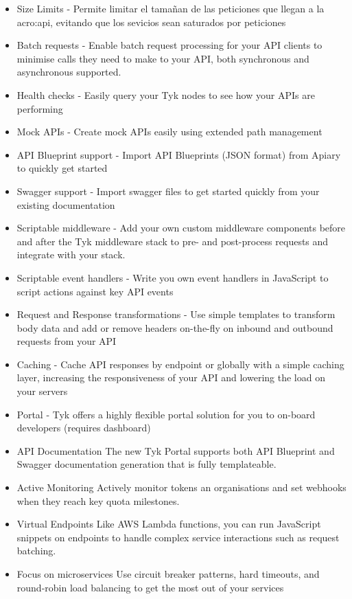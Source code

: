 \begin{itemize}
  \item Size Limits - Permite limitar el tamañan de las peticiones que llegan a la \gls{acro:api}, evitando que los sevicios sean saturados por peticiones
  \item Batch requests - Enable batch request processing for your API clients to minimise calls they need to make to your API, both synchronous and asynchronous supported.
  \item Health checks - Easily query your Tyk nodes to see how your APIs are performing
  \item Mock APIs - Create mock APIs easily using extended path management
  \item API Blueprint support - Import API Blueprints (JSON format) from Apiary to quickly get started
  \item Swagger support - Import swagger files to get started quickly from your existing documentation
  \item Scriptable middleware - Add your own custom middleware components before and after the Tyk middleware stack to pre- and post-process requests and integrate with your stack.
  \item Scriptable event handlers - Write you own event handlers in JavaScript to script actions against key API events
  \item Request and Response transformations - Use simple templates to transform body data and add or remove headers on-the-fly on inbound and outbound requests from your API
  \item Caching - Cache API responses by endpoint or globally with a simple caching layer, increasing the responsiveness of your API and lowering the load on your servers
  \item Portal - Tyk offers a highly flexible portal solution for you to on-board developers (requires dashboard)
  \item API Documentation The new Tyk Portal supports both API Blueprint and Swagger documentation generation that is fully templateable.
  \item Active Monitoring Actively monitor tokens an organisations and set webhooks when they reach key quota milestones.
  \item Virtual Endpoints Like AWS Lambda functions, you can run JavaScript snippets on endpoints to handle complex service interactions such as request batching.
  \item Focus on microservices Use circuit breaker patterns, hard timeouts, and round-robin load balancing to get the most out of your services

\end{itemize}
